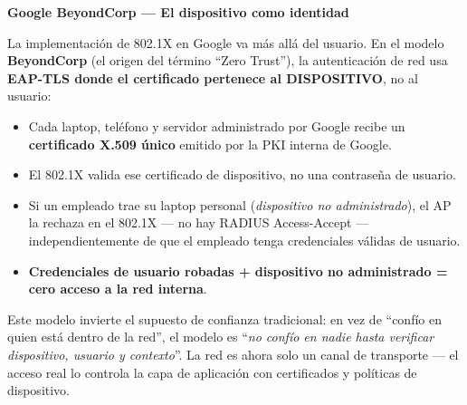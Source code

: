 \begin{moderno}
\textbf{Google BeyondCorp --- El dispositivo como identidad}

La implementación de 802.1X en Google va más allá del usuario. En el modelo
\textbf{BeyondCorp} (el origen del término ``Zero Trust''), la autenticación
de red usa \textbf{EAP-TLS donde el certificado pertenece al DISPOSITIVO},
no al usuario:

\begin{itemize}
    \item Cada laptop, teléfono y servidor administrado por Google recibe un
          \textbf{certificado X.509 único} emitido por la PKI interna de Google.
    \item El 802.1X valida ese certificado de dispositivo, no una contraseña de usuario.
    \item Si un empleado trae su laptop personal (\textit{dispositivo no administrado}),
          el AP la rechaza en el 802.1X --- no hay RADIUS Access-Accept ---
          independientemente de que el empleado tenga credenciales válidas de usuario.
    \item \textbf{Credenciales de usuario robadas + dispositivo no administrado
          = cero acceso a la red interna}.
\end{itemize}

 Este modelo invierte el supuesto de confianza tradicional:
en vez de ``confío en quien está dentro de la red'', el modelo es
``\textit{no confío en nadie hasta verificar dispositivo, usuario y contexto}''.
La red es ahora solo un canal de transporte --- el acceso real lo controla
la capa de aplicación con certificados y políticas de dispositivo.
\end{moderno}
